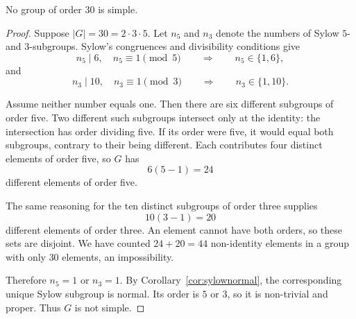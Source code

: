 \begin{proposition}\label{prop:thirty}
No group of order $30$ is simple.
\end{proposition}
\begin{proof}
Suppose $|G|=30=2\cdot3\cdot5$.
Let $n_5$ and $n_3$ denote the numbers
of Sylow $5$- and $3$-subgroups.
Sylow's congruences and divisibility conditions give
\[
n_5\mid6,\quad n_5\equiv1\pmod5
\qquad\Longrightarrow\qquad n_5\in\{1,6\},
\]
and
\[
n_3\mid10,\quad n_3\equiv1\pmod3
\qquad\Longrightarrow\qquad n_3\in\{1,10\}.
\]

Assume neither number equals one. Then there
are six different subgroups of order five.
Two different such subgroups intersect only
at the identity: the intersection has order dividing five.
If its order were five, it would equal both subgroups,
contrary to their being different. Each contributes four distinct
elements of order five, so $G$ has
\[
6(5-1)=24
\]
different elements of order five.

The same reasoning for the ten distinct
subgroups of order three supplies
\[
10(3-1)=20
\]
different elements of order three.
An element cannot have both orders,
so these sets are disjoint.
We have counted $24+20=44$ non-identity
elements in a group with only $30$
elements, an impossibility.

Therefore $n_5=1$ or $n_3=1$.
By Corollary~\ref{cor:sylownormal},
the corresponding unique Sylow subgroup
is normal. Its order is $5$ or $3$,
so it is non-trivial and proper.
Thus $G$ is not simple.
\end{proof}


